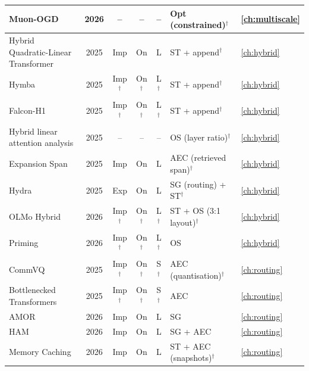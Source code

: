 \begin{longtable}{@{}>{\raggedright\arraybackslash}p{4.1cm}c c c c >{\raggedright\arraybackslash}p{4.2cm}l@{}}
Muon-OGD & 2026 & -- & -- & -- & Opt (constrained)$^{\dagger}$ & \cref{ch:multiscale} \\
\midrule
Hybrid Quadratic-Linear Transformer & 2025 & Imp & On & L & ST + append$^{\dagger}$ & \cref{ch:hybrid} \\
Hymba & 2025 & Imp$^{\dagger}$ & On$^{\dagger}$ & L$^{\dagger}$ & ST + append$^{\dagger}$ & \cref{ch:hybrid} \\
Falcon-H1 & 2025 & Imp$^{\dagger}$ & On$^{\dagger}$ & L$^{\dagger}$ & ST + append$^{\dagger}$ & \cref{ch:hybrid} \\
Hybrid linear attention analysis & 2025 & -- & -- & -- & OS (layer ratio)$^{\dagger}$ & \cref{ch:hybrid} \\
Expansion Span & 2025 & Imp & On & L & AEC (retrieved span)$^{\dagger}$ & \cref{ch:hybrid} \\
Hydra & 2025 & Exp & On & L & SG (routing) + ST$^{\dagger}$ & \cref{ch:hybrid} \\
OLMo Hybrid & 2026 & Imp$^{\dagger}$ & On$^{\dagger}$ & L$^{\dagger}$ & ST + OS (3:1 layout)$^{\dagger}$ & \cref{ch:hybrid} \\
Priming & 2026 & Imp$^{\dagger}$ & On$^{\dagger}$ & L$^{\dagger}$ & OS & \cref{ch:hybrid} \\
\midrule
CommVQ & 2025 & Imp$^{\dagger}$ & On$^{\dagger}$ & S$^{\dagger}$ & AEC (quantisation)$^{\dagger}$ & \cref{ch:routing} \\
Bottlenecked Transformers & 2025 & Imp$^{\dagger}$ & On$^{\dagger}$ & S$^{\dagger}$ & AEC & \cref{ch:routing} \\
AMOR & 2026 & Imp & On & L & SG & \cref{ch:routing} \\
HAM & 2026 & Imp & On & L & SG + AEC & \cref{ch:routing} \\
Memory Caching & 2026 & Imp & On & L & ST + AEC (snapshots)$^{\dagger}$ & \cref{ch:routing} \\
\end{longtable}
\endgroup


